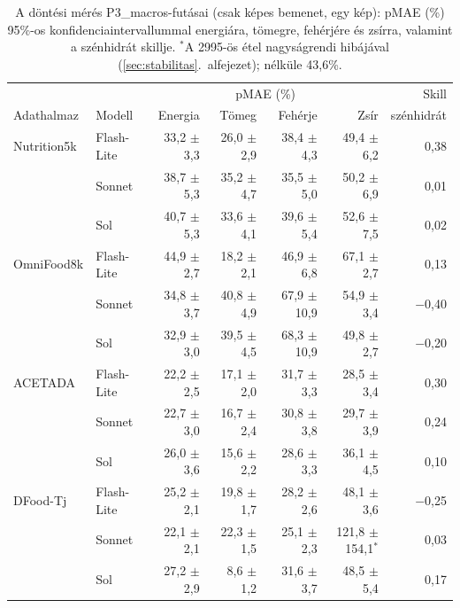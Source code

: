 \begin{table}[h]
\centering
\caption{A döntési mérés P3\_macros-futásai (csak képes bemenet, egy kép): pMAE (\%) 
95\%-os konfidenciaintervallummal energiára, tömegre, fehérjére és zsírra, valamint a 
szénhidrát skillje. $^{*}$A 2995-ös étel nagyságrendi hibájával 
(\ref{sec:stabilitas}.~alfejezet); nélküle 43,6\%.}
\label{tab:kiegeszito_pmae}
\small
\setlength{\tabcolsep}{4pt}
\begin{tabular}{llrrrrr}
\hline
 & & \multicolumn{4}{c}{pMAE (\%)} & Skill \\
Adathalmaz & Modell & Energia & Tömeg & Fehérje & Zsír & szénhidrát \\
\hline
Nutrition5k & Flash-Lite & 33{,}2 $\pm$ 3{,}3 & 26{,}0 $\pm$ 2{,}9 & 38{,}4 $\pm$ 4{,}3 & 49{,}4 $\pm$ 6{,}2 & 0{,}38 \\
 & Sonnet & 38{,}7 $\pm$ 5{,}3 & 35{,}2 $\pm$ 4{,}7 & 35{,}5 $\pm$ 5{,}0 & 50{,}2 $\pm$ 6{,}9 & 0{,}01 \\
 & Sol & 40{,}7 $\pm$ 5{,}3 & 33{,}6 $\pm$ 4{,}1 & 39{,}6 $\pm$ 5{,}4 & 52{,}6 $\pm$ 7{,}5 & 0{,}02 \\
\hline
OmniFood8k & Flash-Lite & 44{,}9 $\pm$ 2{,}7 & 18{,}2 $\pm$ 2{,}1 & 46{,}9 $\pm$ 6{,}8 & 67{,}1 $\pm$ 2{,}7 & 0{,}13 \\
 & Sonnet & 34{,}8 $\pm$ 3{,}7 & 40{,}8 $\pm$ 4{,}9 & 67{,}9 $\pm$ 10{,}9 & 54{,}9 $\pm$ 3{,}4 & $-$0{,}40 \\
 & Sol & 32{,}9 $\pm$ 3{,}0 & 39{,}5 $\pm$ 4{,}5 & 68{,}3 $\pm$ 10{,}9 & 49{,}8 $\pm$ 2{,}7 & $-$0{,}20 \\
\hline
ACETADA & Flash-Lite & 22{,}2 $\pm$ 2{,}5 & 17{,}1 $\pm$ 2{,}0 & 31{,}7 $\pm$ 3{,}3 & 28{,}5 $\pm$ 3{,}4 & 0{,}30 \\
 & Sonnet & 22{,}7 $\pm$ 3{,}0 & 16{,}7 $\pm$ 2{,}4 & 30{,}8 $\pm$ 3{,}8 & 29{,}7 $\pm$ 3{,}9 & 0{,}24 \\
 & Sol & 26{,}0 $\pm$ 3{,}6 & 15{,}6 $\pm$ 2{,}2 & 28{,}6 $\pm$ 3{,}3 & 36{,}1 $\pm$ 4{,}5 & 0{,}10 \\
\hline
DFood-Tj & Flash-Lite & 25{,}2 $\pm$ 2{,}1 & 19{,}8 $\pm$ 1{,}7 & 28{,}2 $\pm$ 2{,}6 & 48{,}1 $\pm$ 3{,}6 & $-$0{,}25 \\
 & Sonnet & 22{,}1 $\pm$ 2{,}1 & 22{,}3 $\pm$ 1{,}5 & 25{,}1 $\pm$ 2{,}3 & 121{,}8 $\pm$ 154{,}1$^{*}$ & 0{,}03 \\
 & Sol & 27{,}2 $\pm$ 2{,}9 & 8{,}6 $\pm$ 1{,}2 & 31{,}6 $\pm$ 3{,}7 & 48{,}5 $\pm$ 5{,}4 & 0{,}17 \\
\hline
\end{tabular}
\end{table}


